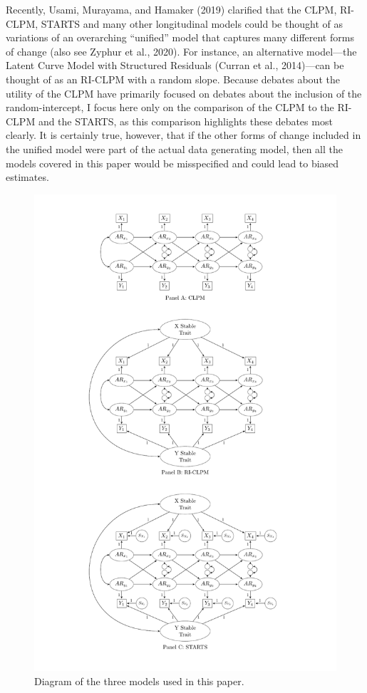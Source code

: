 \documentclass[
  english,
  man,floatsintext]{apa6}
\begin{document}
Recently, Usami, Murayama, and Hamaker (2019) clarified that the CLPM, RI-CLPM, STARTS and many other longitudinal models could be thought of as variations of an overarching ``unified'' model that captures many different forms of change (also see Zyphur et al., 2020). For instance, an alternative model---the Latent Curve Model with Structured Residuals (Curran et al., 2014)---can be thought of as an RI-CLPM with a random slope. Because debates about the utility of the CLPM have primarily focused on debates about the inclusion of the random-intercept, I focus here only on the comparison of the CLPM to the RI-CLPM and the STARTS, as this comparison highlights these debates most clearly. It is certainly true, however, that if the other forms of change included in the unified model were part of the actual data generating model, then all the models covered in this paper would be misspecified and could lead to biased estimates.

\begin{figure}
\includegraphics[height=0.9\textheight]{images/comboFigure} \caption{Diagram of the three models used in this paper.}\label{fig:riclpmFig}
\end{figure}
\end{document}
